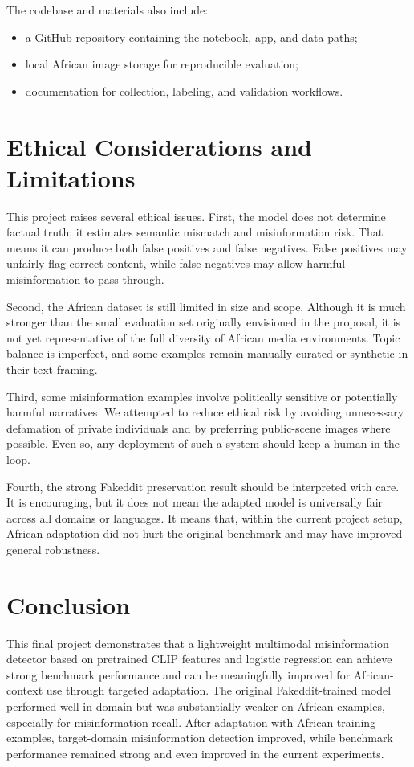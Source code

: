 \documentclass[a4paper,10.5pt,twoside]{article}
\begin{document}
The codebase and materials also include:
\begin{itemize}[leftmargin=1.5em]
    \item a GitHub repository containing the notebook, app, and data paths;
    \item local African image storage for reproducible evaluation;
    \item documentation for collection, labeling, and validation workflows.
\end{itemize}

\section{Ethical Considerations and Limitations}
This project raises several ethical issues. First, the model does not determine factual truth; it estimates semantic mismatch and misinformation risk. That means it can produce both false positives and false negatives. False positives may unfairly flag correct content, while false negatives may allow harmful misinformation to pass through.

Second, the African dataset is still limited in size and scope. Although it is much stronger than the small evaluation set originally envisioned in the proposal, it is not yet representative of the full diversity of African media environments. Topic balance is imperfect, and some examples remain manually curated or synthetic in their text framing.

Third, some misinformation examples involve politically sensitive or potentially harmful narratives. We attempted to reduce ethical risk by avoiding unnecessary defamation of private individuals and by preferring public-scene images where possible. Even so, any deployment of such a system should keep a human in the loop.

Fourth, the strong Fakeddit preservation result should be interpreted with care. It is encouraging, but it does not mean the adapted model is universally fair across all domains or languages. It means that, within the current project setup, African adaptation did not hurt the original benchmark and may have improved general robustness.

\section{Conclusion}
This final project demonstrates that a lightweight multimodal misinformation detector based on pretrained CLIP features and logistic regression can achieve strong benchmark performance and can be meaningfully improved for African-context use through targeted adaptation. The original Fakeddit-trained model performed well in-domain but was substantially weaker on African examples, especially for misinformation recall. After adaptation with African training examples, target-domain misinformation detection improved, while benchmark performance remained strong and even improved in the current experiments.
\end{document}
